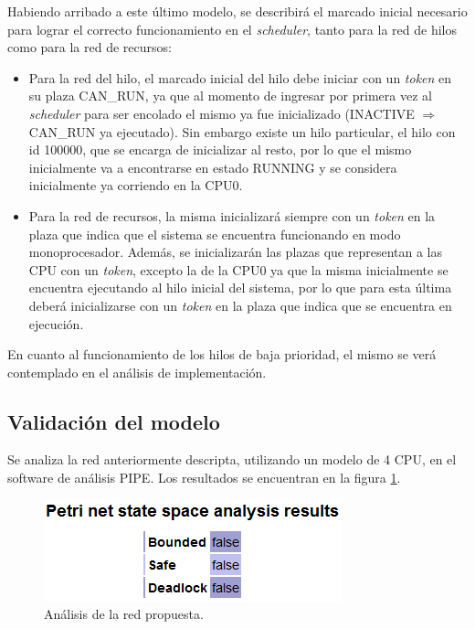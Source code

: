 \documentclass[a4paper]{book}
\begin{document}
Habiendo arribado a este \'ultimo modelo, se describir\'a el marcado inicial necesario para lograr el correcto funcionamiento en el \emph{scheduler}, tanto para la red de hilos como para la red de recursos:
\begin{itemize}
\item Para la red del hilo, el marcado inicial del hilo debe iniciar con un \emph{token} en su plaza CAN\_RUN, ya que al momento de ingresar por primera vez al \emph{scheduler} para ser encolado el mismo ya fue inicializado (INACTIVE $\Rightarrow$ CAN\_RUN ya ejecutado). Sin embargo existe un hilo particular, el hilo con id 100000, que se encarga de inicializar al resto, por lo que el mismo inicialmente va a encontrarse en estado RUNNING y se considera inicialmente ya corriendo en la CPU0.
\item Para la red de recursos, la misma inicializar\'a siempre con un \emph{token} en la plaza que indica que el sistema se encuentra funcionando en modo monoprocesador. Adem\'as, se inicializar\'an las plazas que representan a las CPU con un \emph{token}, excepto la de la CPU0 ya que la misma inicialmente se encuentra ejecutando al hilo inicial del sistema, por lo que para esta \'ultima deber\'a inicializarse con un \emph{token} en la plaza que indica que se encuentra en ejecuci\'on.
\end{itemize}

En cuanto al funcionamiento de los hilos de baja prioridad, el mismo se ver\'a contemplado en el an\'alisis de implementaci\'on.

\subsection{Validaci\'on del modelo}
Se analiza la red anteriormente descripta, utilizando un modelo de 4 CPU, en el software de an\'alisis PIPE. Los resultados se encuentran en la figura \ref{Fig:validacion13}.

\begin{figure} [H]
	\begin{center}
        \includegraphics[scale=0.7]{./imagenes/it13validacion.png}
		\caption{An\'alisis de la red propuesta.}
		\label{Fig:validacion13}
	\end{center}
\end{figure}
\end{document}
